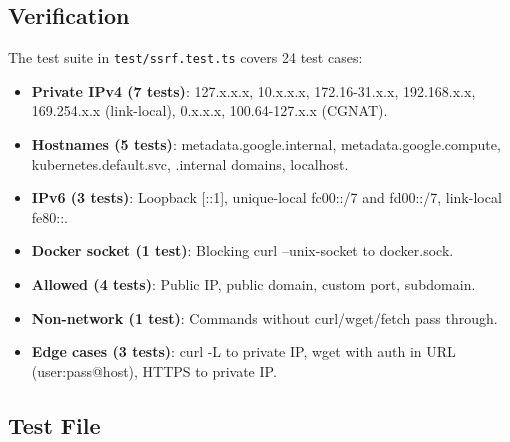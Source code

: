 \subsection*{Verification}
The test suite in \texttt{test/ssrf.test.ts} covers 24 test cases:

\begin{itemize}
    \item \textbf{Private IPv4 (7 tests)}: 127.x.x.x, 10.x.x.x, 172.16-31.x.x, 192.168.x.x, 169.254.x.x (link-local), 0.x.x.x, 100.64-127.x.x (CGNAT).
    \item \textbf{Hostnames (5 tests)}: metadata.google.internal, metadata.google.compute, kubernetes.default.svc, .internal domains, localhost.
    \item \textbf{IPv6 (3 tests)}: Loopback [::1], unique-local fc00::/7 and fd00::/7, link-local fe80::.
    \item \textbf{Docker socket (1 test)}: Blocking curl --unix-socket to docker.sock.
    \item \textbf{Allowed (4 tests)}: Public IP, public domain, custom port, subdomain.
    \item \textbf{Non-network (1 test)}: Commands without curl/wget/fetch pass through.
    \item \textbf{Edge cases (3 tests)}: curl -L to private IP, wget with auth in URL (user:pass@host), HTTPS to private IP.
\end{itemize}

\subsection*{Test File}
